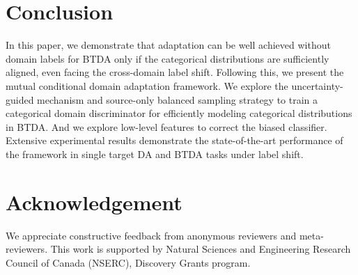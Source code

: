 \documentclass[letterpaper]{article} \usepackage{aaai23}  \usepackage{times}  \usepackage{helvet}  \usepackage{courier}  \usepackage[hyphens]{url}  \usepackage{graphicx} \urlstyle{rm} \def\UrlFont{\rm}  \usepackage{natbib}  \usepackage{caption} \frenchspacing  \setlength{\pdfpagewidth}{8.5in}  \setlength{\pdfpageheight}{11in}
\begin{document}
\section{Conclusion}
In this paper, we demonstrate that adaptation can be well achieved without domain labels for BTDA only if the categorical distributions are sufficiently aligned, even facing the cross-domain label shift. Following this, we present the mutual conditional domain adaptation framework. We explore the uncertainty-guided mechanism and source-only balanced sampling strategy to train a categorical domain discriminator for efficiently modeling categorical distributions in BTDA. And we explore low-level features to correct the biased classifier. Extensive experimental results demonstrate the state-of-the-art performance of the framework in single target DA and BTDA tasks under label shift.

\section{Acknowledgement}
We appreciate constructive feedback from anonymous reviewers and meta-reviewers. This work is supported by Natural Sciences and Engineering Research Council of Canada (NSERC), Discovery Grants program.



\end{document}

